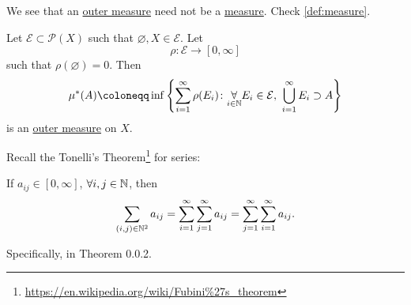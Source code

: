 \begin{remark}
	We see that an \hyperref[def:outer-measure]{outer measure} need not be a \hyperref[def:measure]{measure}. Check \autoref{def:measure}.
\end{remark}

\begin{proposition}\label{prop:outer-measure}
	Let \(\mathcal{E} \subset \mathcal{P} (X)\) such that \(\varnothing, X \in  \mathcal{E} \). Let
	\[
		\rho\colon \mathcal{E} \to [0, \infty ]
	\]
	such that \(\rho(\varnothing ) = 0\). Then
	\[
		\mu^{*} (A) \coloneqq \inf\left\{\sum\limits_{i=1}^{\infty} \rho(E_{i})\colon \underset{i\in \mathbb{\MakeUppercase{N}} }{\forall}E_{i}\in \mathcal{E},\ \bigcup\limits_{i=1}^{\infty} E_{i}\supset A\right\}
	\]
	is an \hyperref[def:outer-measure]{outer measure} on \(X\).
\end{proposition}

\begin{note}\label{thm:Tonelli-theorem-for-series}
	Recall the Tonelli's Theorem\footnote{\url{https://en.wikipedia.org/wiki/Fubini\%27s_theorem}} for series:
	\par If \(a_{ij}\in [0, \infty ]\), \(\forall i, j\in \mathbb{\MakeUppercase{N}} \), then
	\[
		\sum\limits_{(i, j)\in\mathbb{\MakeUppercase{N}} ^2}a_{ij} = \sum\limits_{i=1}^{\infty} \sum\limits_{j=1}^{\infty} a_{ij} = \sum\limits_{j=1}^{\infty} \sum\limits_{i=1}^{\infty} a_{ij}.
	\]

	Specifically, in \cite{tao2013introduction} Theorem 0.0.2.
\end{note}